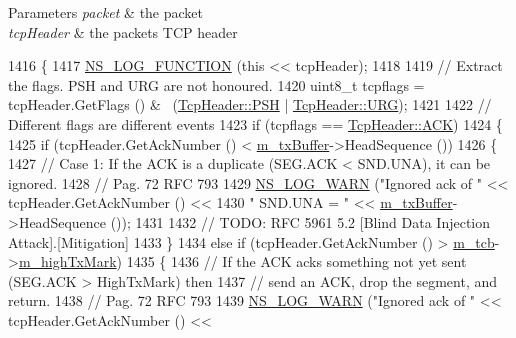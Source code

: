 \begin{DoxyParams}{Parameters}
{\em packet} & the packet \\
\hline
{\em tcp\+Header} & the packet\textquotesingle{}s T\+CP header \\
\hline
\end{DoxyParams}

\begin{DoxyCode}
1416 \{
1417   \hyperlink{log-macros-disabled_8h_a90b90d5bad1f39cb1b64923ea94c0761}{NS\_LOG\_FUNCTION} (\textcolor{keyword}{this} << tcpHeader);
1418 
1419   \textcolor{comment}{// Extract the flags. PSH and URG are not honoured.}
1420   uint8\_t tcpflags = tcpHeader.GetFlags () & ~(\hyperlink{classns3_1_1TcpHeader_a5f3d432941327854b5ad621e467479c6a3f1e9f1fc7466d436279cfe7ab9ef3db}{TcpHeader::PSH} | 
      \hyperlink{classns3_1_1TcpHeader_a5f3d432941327854b5ad621e467479c6a03d58c80bf87169baf9f2f4896b7cf65}{TcpHeader::URG});
1421 
1422   \textcolor{comment}{// Different flags are different events}
1423   \textcolor{keywordflow}{if} (tcpflags == \hyperlink{classns3_1_1TcpHeader_a5f3d432941327854b5ad621e467479c6a1182e63050402c9f49208c62c1ec2d5c}{TcpHeader::ACK})
1424     \{
1425       \textcolor{keywordflow}{if} (tcpHeader.GetAckNumber () < \hyperlink{classns3_1_1TcpSocketBase_a4a1b53982ffd851bd07ab8d5005c130e}{m\_txBuffer}->HeadSequence ())
1426         \{
1427           \textcolor{comment}{// Case 1:  If the ACK is a duplicate (SEG.ACK < SND.UNA), it can be ignored.}
1428           \textcolor{comment}{// Pag. 72 RFC 793}
1429           \hyperlink{group__logging_gade7208b4009cdf0e25783cd26766f559}{NS\_LOG\_WARN} (\textcolor{stringliteral}{"Ignored ack of "} << tcpHeader.GetAckNumber () <<
1430                        \textcolor{stringliteral}{" SND.UNA = "} << \hyperlink{classns3_1_1TcpSocketBase_a4a1b53982ffd851bd07ab8d5005c130e}{m\_txBuffer}->HeadSequence ());
1431 
1432           \textcolor{comment}{// TODO: RFC 5961 5.2 [Blind Data Injection Attack].[Mitigation]}
1433         \}
1434       \textcolor{keywordflow}{else} \textcolor{keywordflow}{if} (tcpHeader.GetAckNumber () > \hyperlink{classns3_1_1TcpSocketBase_a26bbaf59001308dc43fb630d76f2e38b}{m\_tcb}->\hyperlink{classns3_1_1TcpSocketState_a2c46f51fd8e2bf43b564ea838b43b8bb}{m\_highTxMark})
1435         \{
1436           \textcolor{comment}{// If the ACK acks something not yet sent (SEG.ACK > HighTxMark) then}
1437           \textcolor{comment}{// send an ACK, drop the segment, and return.}
1438           \textcolor{comment}{// Pag. 72 RFC 793}
1439           \hyperlink{group__logging_gade7208b4009cdf0e25783cd26766f559}{NS\_LOG\_WARN} (\textcolor{stringliteral}{"Ignored ack of "} << tcpHeader.GetAckNumber () <<

\end{DoxyCode}
